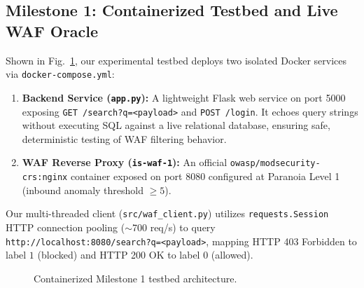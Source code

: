 \documentclass[conference]{IEEEtran}
\newcommand{\WAF}{\textsc{WAF}}
\begin{document}
\subsection{Milestone 1: Containerized Testbed and Live WAF Oracle}
Shown in Fig.~\ref{fig:docker}, our experimental testbed deploys two isolated Docker services via \texttt{docker-compose.yml}:
\begin{enumerate}
    \item \textbf{Backend Service (\texttt{app.py}):} A lightweight Flask web service on port 5000 exposing \texttt{GET /search?q=<payload>} and \texttt{POST /login}. It echoes query strings without executing SQL against a live relational database, ensuring safe, deterministic testing of \WAF{} filtering behavior.
    \item \textbf{WAF Reverse Proxy (\texttt{is-waf-1}):} An official \texttt{owasp/modsecurity-crs:nginx} container exposed on port 8080 configured at Paranoia Level 1 (inbound anomaly threshold $\ge 5$).
\end{enumerate}
Our multi-threaded client (\texttt{src/waf\_client.py}) utilizes \texttt{requests.Session} HTTP connection pooling ($\sim$700 req/s) to query \texttt{http://localhost:8080/search?q=<payload>}, mapping HTTP 403 Forbidden to label $1$ (blocked) and HTTP 200 OK to label $0$ (allowed).

\begin{figure}[t]
\centering
{}
\caption{Containerized Milestone 1 testbed architecture.}
\label{fig:docker}
\end{figure}
\end{document}
